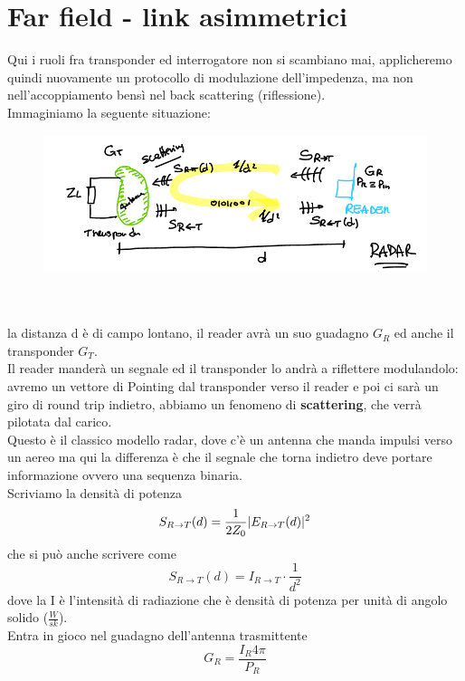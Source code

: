 \documentclass[oneside, 12pt]{extbook}
\DeclarePairedDelimiter{\abs}{\lvert}{\rvert}
\begin{document}
\section{Far field - link asimmetrici}
Qui i ruoli fra transponder ed interrogatore non si scambiano mai, applicheremo quindi nuovamente un protocollo di modulazione dell'impedenza, ma non nell'accoppiamento bensì nel back scattering (riflessione).\\Immaginiamo la seguente situazione:\\
\begin{figure}[!h]
	\includegraphics[scale=0.4]{immagini/back_scatt.png}
\end{figure}
\\\\la distanza d è di campo lontano, il reader avrà un suo guadagno $G_R$ ed anche il transponder $G_T$.\\Il reader manderà un segnale ed il transponder lo andrà a riflettere modulandolo: avremo un vettore di Pointing dal transponder verso il reader e poi ci sarà un giro di round trip indietro, abbiamo un fenomeno di \textbf{scattering}, che verrà pilotata dal carico.\\Questo è il classico modello radar, dove c'è un antenna che manda impulsi verso un aereo ma qui la differenza è che il segnale che torna indietro deve portare informazione ovvero una sequenza binaria.\\Scriviamo la densità di potenza 
\begin{equation}
	S_{R \rightarrow T}(d) = \frac{1}{2Z_0}\abs{E_{R \rightarrow T}(d)}^2	
\end{equation}
che si può anche scrivere come 
\begin{equation}
	S_{R \rightarrow T}(d) = I_{R \rightarrow T} \cdot \frac{1}{d^2}
\end{equation}
dove la I è l'intensità di radiazione che è densità di potenza per unità di angolo solido ($\frac{W}{sk}$).\\Entra in gioco nel guadagno dell'antenna trasmittente
\begin{equation}
	G_R = \frac{I_R 4\pi}{P_R}	
\end{equation}
\end{document}

